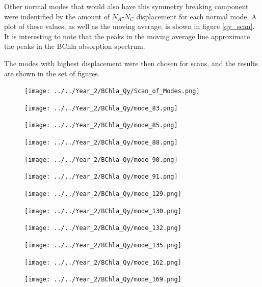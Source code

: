 Other normal modes that would also have this symmetry breaking component were indentified
by the amount of $N_A$-$N_C$ displacement for each normal mode. A plot of these
values, as well as the moving average, is shown in figure \ref{qy_scan}.
It is interesting to note that the peaks in the moving average line approximate
the peaks in the BChla absorption spectrum.

The modes with highest displacement were then chosen for scans, and the results
are shown in the set of figures.

\begin{figure}
    \texttt{[image: ../../Year\_2/BChla\_Qy/Scan\_of\_Modes.png]}
    \label{fig:qy_scan}
\end{figure}

\begin{figure}
    \texttt{[image: ../../Year\_2/BChla\_Qy/mode\_83.png]}
\end{figure}
\begin{figure}
    \texttt{[image: ../../Year\_2/BChla\_Qy/mode\_85.png]}
\end{figure}
\begin{figure}
    \texttt{[image: ../../Year\_2/BChla\_Qy/mode\_88.png]}
\end{figure}
\begin{figure}
    \texttt{[image: ../../Year\_2/BChla\_Qy/mode\_90.png]}
\end{figure}
\begin{figure}
    \texttt{[image: ../../Year\_2/BChla\_Qy/mode\_91.png]}
\end{figure}
\begin{figure}
    \texttt{[image: ../../Year\_2/BChla\_Qy/mode\_129.png]}
\end{figure}
\begin{figure}
    \texttt{[image: ../../Year\_2/BChla\_Qy/mode\_130.png]}
\end{figure}
\begin{figure}
    \texttt{[image: ../../Year\_2/BChla\_Qy/mode\_132.png]}
\end{figure}
\begin{figure}
    \texttt{[image: ../../Year\_2/BChla\_Qy/mode\_135.png]}
\end{figure}
\begin{figure}
    \texttt{[image: ../../Year\_2/BChla\_Qy/mode\_162.png]}
\end{figure}
\begin{figure}
    \texttt{[image: ../../Year\_2/BChla\_Qy/mode\_169.png]}
\end{figure}

